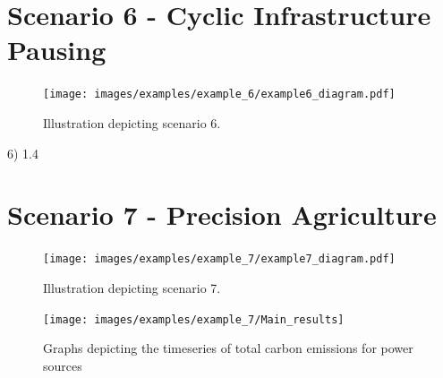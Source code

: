 \documentclass{l4proj}
\begin{document}
\section{Scenario 6 - Cyclic Infrastructure Pausing}\label{eval:subsec:scenario 6}
\begin{figure}[h]
    \centering
    \texttt{[image: images/examples/example\_6/example6\_diagram.pdf]}
    ~
    \caption{Illustration depicting scenario 6.}
    \label{fig:example6_diagram}
\end{figure}
6)	1.4


\section{Scenario 7 - Precision Agriculture}\label{eval:subsec:scenario 7}
\begin{figure}[h]
    \centering
    \texttt{[image: images/examples/example\_7/example7\_diagram.pdf]}
    ~
    \caption{Illustration depicting scenario 7.}
    \label{fig:example7_diagram}
\end{figure}
\begin{figure}[h]
    \centering
    \texttt{[image: images/examples/example\_7/Main\_results]}
    ~
    \caption{Graphs depicting the timeseries of total carbon emissions for power sources}
    \label{fig:example7_final_results}
\end{figure}

%
%
%
\end{document}
